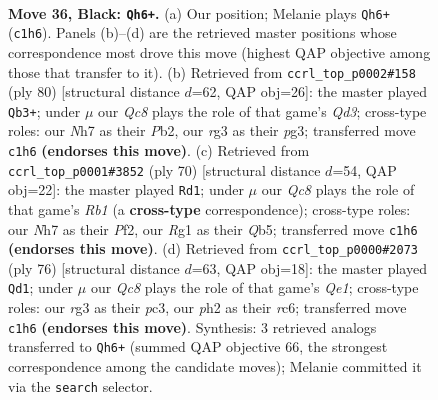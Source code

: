 \documentclass[11pt]{article}
\begin{document}
\clearpage

\begin{figure}[p]\centering
\begin{subfigure}{0.46\textwidth}\centering
\resizebox{\linewidth}{!}{%
\newchessgame
\chessboard[
  setfen={7k/p2p3n/2p2p2/8/1P1P2Q1/6RK/5P1P/2q3r1 b - - 5 36},
  showmover=false,
  pgfstyle=straightmove, color=movearrow, markmove={c1-h6}
]}
\caption{}
\end{subfigure}\hfill
\begin{subfigure}{0.46\textwidth}\centering
\resizebox{\linewidth}{!}{%
\newchessgame
\chessboard[
  setfen={q4rk1/p5p1/1pnN3p/8/7P/P2Q1Rp1/1P4K1/8 w - - 6 41},
  showmover=false,
  pgfstyle=straightmove, color=movearrow, markmove={d3-b3}
]}
\caption{}
\end{subfigure}
\\[4pt]
\begin{subfigure}{0.46\textwidth}\centering
\resizebox{\linewidth}{!}{%
\newchessgame
\chessboard[
  setfen={1N2r1k1/p4pp1/7p/1Q6/4q2P/3p2P1/5P2/1R4K1 w - - 0 36},
  showmover=false,
  pgfstyle=straightmove, color=movearrow, markmove={b1-d1}
]}
\caption{}
\end{subfigure}\hfill
\begin{subfigure}{0.46\textwidth}\centering
\resizebox{\linewidth}{!}{%
\newchessgame
\chessboard[
  setfen={8/7p/2r3k1/6p1/P1qP4/2p1P1P1/2R5/4Q1K1 w - - 1 39},
  showmover=false,
  pgfstyle=straightmove, color=movearrow, markmove={e1-d1}
]}
\caption{}
\end{subfigure}
\caption{\textbf{Move 36, Black: \texttt{Qh6+}.} (a) Our position; Melanie plays \texttt{Qh6+} (\texttt{c1h6}). Panels (b)--(d) are the retrieved master positions whose correspondence most drove this move (highest QAP objective among those that transfer to it). (b) Retrieved from \texttt{ccrl\_top\_p0002\#158} (ply 80) [structural distance $d$=62, QAP obj=26]: the master played \texttt{Qb3+}; under $\mu$ our \emph{Qc8} plays the role of that game's \emph{Qd3}; cross-type roles: our \emph{N}h7 as their \emph{P}b2, our \emph{r}g3 as their \emph{p}g3; transferred move \texttt{c1h6} \textbf{(endorses this move)}. (c) Retrieved from \texttt{ccrl\_top\_p0001\#3852} (ply 70) [structural distance $d$=54, QAP obj=22]: the master played \texttt{Rd1}; under $\mu$ our \emph{Qc8} plays the role of that game's \emph{Rb1} (a \textbf{cross-type} correspondence); cross-type roles: our \emph{N}h7 as their \emph{P}f2, our \emph{R}g1 as their \emph{Q}b5; transferred move \texttt{c1h6} \textbf{(endorses this move)}. (d) Retrieved from \texttt{ccrl\_top\_p0000\#2073} (ply 76) [structural distance $d$=63, QAP obj=18]: the master played \texttt{Qd1}; under $\mu$ our \emph{Qc8} plays the role of that game's \emph{Qe1}; cross-type roles: our \emph{r}g3 as their \emph{p}c3, our \emph{p}h2 as their \emph{r}c6; transferred move \texttt{c1h6} \textbf{(endorses this move)}. Synthesis: 3 retrieved analogs transferred to \texttt{Qh6+} (summed QAP objective 66, the strongest correspondence among the candidate moves); Melanie committed it via the \texttt{search} selector.}
\label{fig:thought-m71}
\end{figure}
\end{document}
